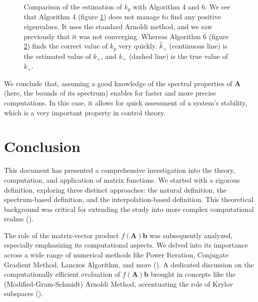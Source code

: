 \documentclass[11pt]{article}
\numberwithin{equation}{section}
\begin{document}
\begin{figure}
    \centering
    \begin{subfigure}[b]{.45\linewidth}
        
        \caption{}
        \label{fig:wrong_kp}
    \end{subfigure}\hspace{0.05\linewidth}
    \begin{subfigure}[b]{.45\linewidth}
        
        \caption{}
        \label{fig:correct_kp}
    \end{subfigure}
    \caption{Comparison of the estimation of $k_p$ with Algorithm 4 and 6. We see that Algorithm 4 (figure \ref{fig:wrong_kp}) does not manage to find any positive eigenvalues. It uses the standard Arnoldi method, and we saw previously that it was not converging. Whereas Algorithm 6 (figure \ref{fig:correct_kp}) finds the correct value of $k_p$ very quickly. $\hat{k}_+$ (continuous line) is the estimated value of $k_+$, and $k_+$ (dashed line) is the true value of $k_+$.}
    \label{fig:kp}
\end{figure}

We conclude that, assuming a good knowledge of the spectral properties of $\mathbf{A}$ (here, the bounds of its spectrum) enables for faster and more precise computations. In this case, it allows for quick assessment of a system's stability, which is a very important property in control theory.

\section{Conclusion}

This document has presented a comprehensive investigation into the theory, computation, and application of matrix functions. We started with a rigorous definition, exploring three distinct approaches: the natural definition, the spectrum-based definition, and the interpolation-based definition. This theoretical background was critical for extending the study into more complex computational realms (\cite{higham2008functions}).

The role of the matrix-vector product \(f(\mathbf{A})\mathbf{b}\) was subsequently analyzed, especially emphasizing its computational aspects. We delved into its importance across a wide range of numerical methods like Power Iteration, Conjugate Gradient Method, Lanczos Algorithm, and more (\cite{golub2013matrix}). A dedicated discussion on the computationally efficient evaluation of \(f(\mathbf{A})\mathbf{b}\) brought in concepts like the (Modified-Gram-Schmidt) Arnoldi Method, accentuating the role of Krylov subspaces (\cite{liesen2013krylov}).
\end{document}
